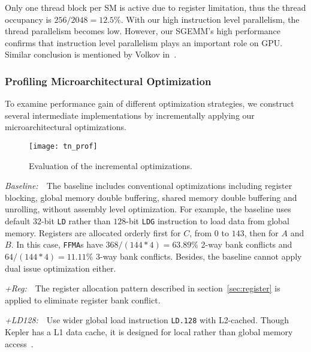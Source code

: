 
Only one thread block per SM is active due to register limitation, thus the thread occupancy is $256/2048=12.5\%$.
With our high instruction level parallelism, the thread parallelism becomes low.
However, our SGEMM's high performance confirms that instruction level parallelism plays an important role on GPU.
Similar conclusion is mentioned by Volkov in~\cite{volkov2010better}.

\subsubsection{Profiling Microarchitectural Optimization}

To examine performance gain of different optimization strategies, we construct several intermediate 
implementations by incrementally applying our microarchitectural optimizations.
\begin{figure}[htbp]
\begin{center}
\texttt{[image: tn\_prof]}
    \caption{Evaluation of the incremental optimizations.}
\label{fig:th_prof}
\end{center}
\end{figure}

{\it Baseline:}~~The baseline includes conventional optimizations including register blocking, global
memory double buffering, shared memory double buffering and unrolling, without assembly level optimization.
For example, the baseline uses default $32$-bit {\tt LD} rather than $128$-bit {\tt LDG} instruction to load data from global memory.
Registers are allocated orderly first for $C$, from $0$ to $143$, then for $A$ and $B$. 
In this case, {\tt FFMA}s have $368/(144*4)=63.89\%$ 2-way bank conflicts and $64/(144*4)=11.11\%$ 3-way bank conflicts. 
Besides, the baseline cannot apply dual issue optimization either.

{\it +Reg:}~~The register allocation pattern described in section~\ref{sec:register} is applied to eliminate register bank conflict. 

{\it +LD128:}~~Use wider global load instruction {\tt LD.128} with L2-cached.
Though Kepler has a L1 data cache, it is designed for local rather than global memory access~\cite{gk110}.

